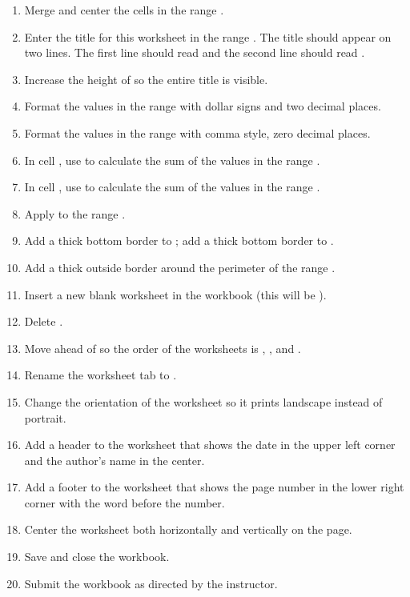 \begin{enumerate}
	\item Merge and center the cells in the range .
	\item Enter the title for this worksheet in the range . The title should appear on two lines. The first line should read  and the second line should read .
	\item Increase the height of  so the entire title is visible.
	\item Format the values in the range  with dollar signs and two decimal places.
	\item Format the values in the range  with comma style, zero decimal places.
	\item In cell , use  to calculate the sum of the values in the range .
	\item In cell , use  to calculate the sum of the values in the range .
	\item Apply  to the range .
	\item Add a thick bottom border to ; add a thick bottom border to .
	\item Add a thick outside border around the perimeter of the range .
	\item Insert a new blank worksheet in the workbook (this will be ).
	\item Delete .
	\item Move  ahead of  so the order of the worksheets is , , and .
	\item Rename the  worksheet tab to .
	\item Change the orientation of the  worksheet so it prints landscape instead of portrait.
	\item Add a header to the  worksheet that shows the date in the upper left corner and the author's name in the center.
	\item Add a footer to the  worksheet that shows the page number in the lower right corner with the word  before the number.
	\item Center the worksheet both horizontally and vertically on the page.
	\item Save and close the  workbook.
	\item Submit the  workbook as directed by the instructor.

\end{enumerate}
